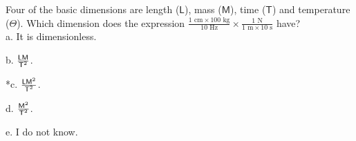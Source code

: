 
Four of the basic dimensions are length ($\textsf{L}$), mass ($\textsf{M}$), time ($\textsf{T}$) and temperature ($\Theta$). Which dimension does the expression $\frac{1\text{ cm} \times 100\text{ kg}}{10\text{ Hz}} \times \frac{1\text{ N}}{1\text{ m} \times 10\text{ s}}$ have?\\

a. It is dimensionless.

b. $\frac{\text{\textsf{LM}}}{\text{\textsf{T}}^{2}}$.

*c. $\frac{\text{\textsf{LM}}^{2}}{\text{\textsf{T}}^{2}}$.

d. $\frac{\text{\textsf{M}}^{2}}{\text{\textsf{T}}^{2}}$.

e. I do not know.\\
